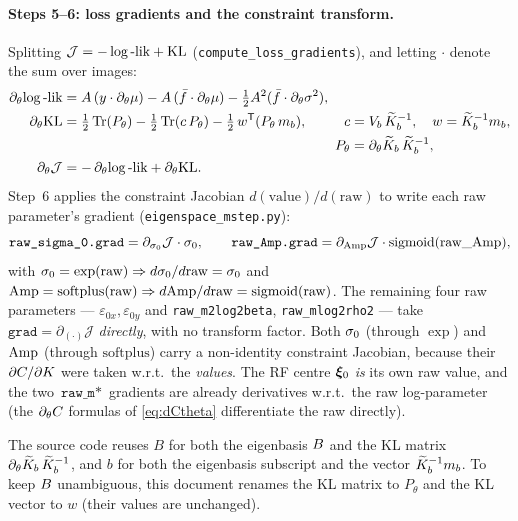 \paragraph{Steps 5--6: loss gradients and the constraint transform.}
Splitting $\mathcal{J}=-\log\text{-lik}+\mathrm{KL}$
(\texttt{compute\_loss\_gradients}), and letting $\cdot$ denote the sum over
images:
\begin{align}
\partial_\theta\!\log\text{-lik}
  &= A\,(y\cdot\partial_\theta\mu)
    - A\,(\bar{f}\cdot\partial_\theta\mu)
    - \tfrac12A^2(\bar{f}\cdot\partial_\theta\sigma^{2}),\\
\partial_\theta\mathrm{KL}
  &= \tfrac12\operatorname{Tr}(P_\theta)-\tfrac12\operatorname{Tr}(c\,P_\theta)-\tfrac12\,w^{\mathsf{T}}(P_\theta\,m_{b}),
    \qquad
    \begin{aligned}[t]
      c&=V_{b}\,\widetilde{K}_{b}^{-1},\quad w=\widetilde{K}_{b}^{-1}m_{b},\\
      P_\theta&=\partial_\theta\widetilde{K}_{b}\,\widetilde{K}_{b}^{-1},
    \end{aligned}\\
\partial_\theta\mathcal{J}
  &= -\,\partial_\theta\!\log\text{-lik}+\partial_\theta\mathrm{KL}.
\end{align}
Step~6 applies the constraint Jacobian $d(\text{value})/d(\text{raw})$ to write
each raw parameter's gradient (\texttt{eigenspace\_mstep.py}):
\begin{equation}
\texttt{raw\_sigma\_0.grad} = \partial_{\sigma_{0}}\mathcal{J}\cdot\sigma_{0},
\qquad
\texttt{raw\_Amp.grad} = \partial_{\mathrm{Amp}}\mathcal{J}\cdot\mathrm{sigmoid}(\text{raw\_Amp}),
\end{equation}
with $\sigma_{0}=\exp(\mathrm{raw})\Rightarrow d\sigma_{0}/d\mathrm{raw}=\sigma_{0}$ and
$\mathrm{Amp}=\mathrm{softplus}(\mathrm{raw})\Rightarrow d\mathrm{Amp}/d\mathrm{raw}=\mathrm{sigmoid}(\mathrm{raw})$.
The remaining four raw parameters ---
$\varepsilon_{0x},\varepsilon_{0y}$ and \texttt{raw\_m2log2beta},
\texttt{raw\_mlog2rho2} --- take $\texttt{grad}=\partial_{(\cdot)}\mathcal{J}$
\emph{directly}, with no transform factor. Both $\sigma_{0}$ (through $\exp$) and $\mathrm{Amp}$
(through $\mathrm{softplus}$) carry a non-identity constraint Jacobian, because their
$\partial C/\partial K$ were taken w.r.t.\ the
\emph{values}. The RF centre $\bm{\xi}_{0}$ \emph{is} its own raw value, and the two
$\texttt{raw\_m}\ast$ gradients are already derivatives w.r.t.\ the raw
log-parameter (the $\partial_\theta C$ formulas of \eqref{eq:dCtheta}
differentiate the raw directly).

\begin{remark}
The source code reuses $B$ for both the eigenbasis $B$ and the KL matrix
$\partial_\theta\widetilde{K}_{b}\,\widetilde{K}_{b}^{-1}$, and $b$ for both the eigenbasis subscript
and the vector $\widetilde{K}_{b}^{-1}m_{b}$. To keep $B$ unambiguous, this document renames
the KL matrix to $P_\theta$ and the KL vector to $w$ (their values are unchanged).
\end{remark}

